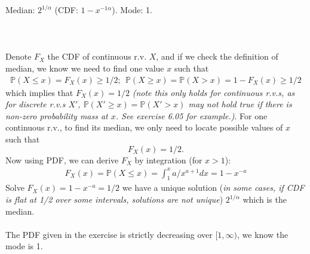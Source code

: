 
\setcounter{theorem}{2}
\begin{exercise} [BH.6.3]
\begin{solution}
    Median: $2^{1/\alpha}$ (CDF: $1-x^{-1\alpha}$). Mode: 1.\\~\\
	\\~\\
	Denote $F_X$ the CDF of continuous r.v. $X$, and if we check the definition of median, we know we need to find one value $x$ such that 
	\begin{align}
		\mathbb{P}(X\leq x)= F_X(x) \geq 1/2;~~ \mathbb{P}(X\geq x)=\mathbb{P}(X > x) =1-F_X(x) \geq 1/2
	\end{align}
	which implies that $F_X(x)=1/2$ \textit{(note this only holds for continuous r.v.s, as for discrete r.v.s $X'$, $\mathbb{P}(X'\geq x)=\mathbb{P}(X' > x)$ may not hold true if there is non-zero probability mass at $x$. See exercise 6.05 for example.)}. For one continuous r.v., to find its median, we only need to locate possible values of $x$ such that $$F_X(x)=1/2.$$  
	Now using PDF, we can derive $F_X$ by integration (for $x>1$):
	\begin{align*}
		F_X(x)=\mathbb{P}\left(X\leq x\right) = \int_{1}^{x} a/x^{a+1} dx =1-x^{-a}
	\end{align*}
	Solve $F_X(x)=1-x^{-a}=1/2$ we have a unique solution (\textit{in some cases, if CDF is flat at 1/2 over some intervals, solutions are not unique}) $2^{1/\alpha}$ which is the median. \\~\\
	The PDF given in the exercise is strictly decreasing over $[1,\infty)$, we know the mode is 1.
\end{solution}
\end{exercise}

